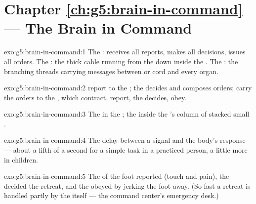 \section*{Chapter \ref{ch:g5:brain-in-command} --- The Brain in Command}

\begin{solution}{exo:g5:brain-in-command:1}
The : receives all reports, makes all decisions, issues
all orders. The : the thick cable running from the
 down inside the . The : the branching threads
carrying messages between  or cord and every organ.
\end{solution}

\begin{solution}{exo:g5:brain-in-command:2}
 report to the ; the  decides and
composes orders;  carry the orders to the , which
contract.  report, the  decides, 
obey.
\end{solution}

\begin{solution}{exo:g5:brain-in-command:3}
The  in the ; the  inside the 's
column of stacked small .
\end{solution}

\begin{solution}{exo:g5:brain-in-command:4}
The delay between a signal and the body's response --- about a
fifth of a second for a simple task in a practiced person, a
little more in children.
\end{solution}

\begin{solution}{exo:g5:brain-in-command:5}
The  of the foot reported (touch and pain), the  decided the retreat, and the   obeyed by
jerking the foot away. (So fast a retreat is handled partly by
the  itself --- the command center's emergency
desk.)
\end{solution}

